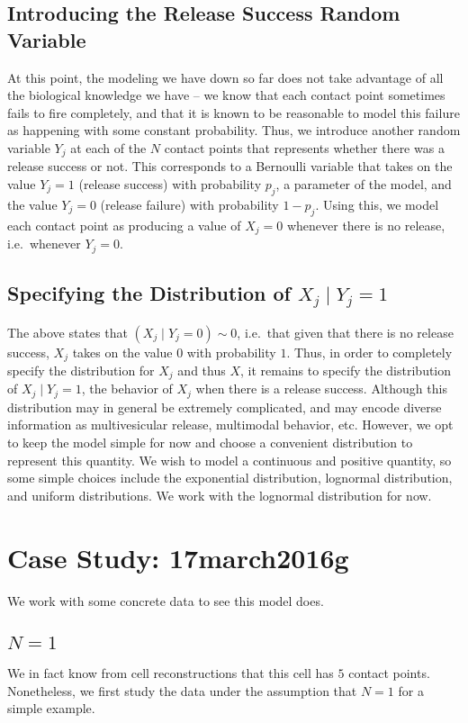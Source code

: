 \documentclass{article}
\begin{document}
\subsection{Introducing the Release Success Random Variable}
At this point, the modeling we have down so far does not take advantage of all the biological knowledge we have -- we know that each contact point sometimes fails to fire completely, and that it is known to be reasonable to model this failure as happening with some constant probability. Thus, we introduce another random variable $Y_j$ at each of the $N$ contact points that represents whether there was a release success or not. This corresponds to a Bernoulli variable that takes on the value $Y_j = 1$ (release success) with probability $p_j$, a parameter of the model, and the value $Y_j = 0$ (release failure) with probability $1-p_j$. Using this, we model each contact point as producing a value of $X_j = 0$ whenever there is no release, i.e.\ whenever $Y_j = 0$. 

\subsection{Specifying the Distribution of $X_j\mid Y_j = 1$}
The above states that $(X_j\mid Y_j=0)\sim 0$, i.e.\ that given that there is no release success, $X_j$ takes on the value $0$ with probability $1$. Thus, in order to completely specify the distribution for $X_j$ and thus $X$, it remains to specify the distribution of $X_j\mid Y_j = 1$, the behavior of $X_j$ when there is a release success. Although this distribution may in general be extremely complicated, and may encode diverse information as multivesicular release, multimodal behavior, etc. However, we opt to keep the model simple for now and choose a convenient distribution to represent this quantity. We wish to model a continuous and positive quantity, so some simple choices include the exponential distribution, lognormal distribution, and uniform distributions. We work with the lognormal distribution for now. 

\section{Case Study: 17march2016g}
We work with some concrete data to see this model does. 

\subsection{$N=1$}
We in fact know from cell reconstructions that this cell has $5$ contact points. Nonetheless, we first study the data under the assumption that $N=1$ for a simple example. 
\end{document}
